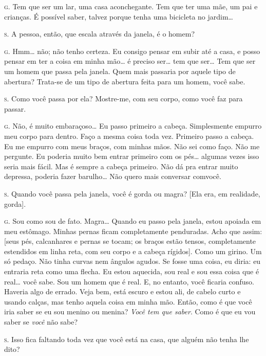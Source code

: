 \noindent\hskip0mm\textsc{g.} Tem que ser um lar, uma casa aconchegante. Tem que ter uma mãe, um
pai e crianças. É possível saber, talvez porque tenha uma bicicleta no
jardim\ldots{}

\noindent\hskip0mm\textsc{s.} A pessoa, então, que escala através da janela, é o homem?

\noindent\hskip0mm\textsc{g.} Hmm\ldots{} não; não tenho certeza. Eu consigo pensar em subir até a casa,
e posso pensar em ter a coisa em minha mão\ldots{} é preciso ser\ldots{} tem que
ser\ldots{} Tem que ser um homem que passa pela janela. Quem mais passaria
por aquele tipo de abertura? Trata-se de um tipo de abertura feita para
um homem, você sabe.

\noindent\hskip0mm\textsc{s.} Como você passa por ela? Mostre-me, com seu corpo, como você faz para
passar.

\noindent\hskip0mm\textsc{g.} Não, é muito embaraçoso\ldots{} Eu passo primeiro a cabeça. Simplesmente
empurro meu corpo para dentro. Faço a mesma coisa toda vez. Primeiro
passo a cabeça. Eu me empurro com meus braços, com minhas mãos. Não sei
como faço. Não me pergunte. Eu poderia muito bem entrar primeiro com os
pés\ldots{} algumas vezes isso seria mais fácil. Mas é sempre a cabeça
primeiro. Não dá pra entrar muito depressa, poderia fazer barulho\ldots{}
Não quero mais conversar com\idxidenhis[|)] você.

\noindent\hskip0mm\textsc{s.} Quando você passa pela janela, você é gorda ou magra? [Ela era, em
realidade, gorda].

\noindent\hskip0mm\textsc{g.} Sou como sou de fato. Magra\ldots{} Quando eu passo pela janela, estou
apoiada em meu estômago. Minhas pernas ficam completamente penduradas.
Acho que assim: [seus pés, calcanhares e pernas se tocam; os braços
estão tensos, completamente estendidos em linha reta, com seu corpo e
a cabeça rígidos]. Como um girino. Um só pedaço. Não tinha curvas nem
ângulos agudos. Se fosse uma coisa, eu diria: eu entraria reta como uma
flecha. Eu estou aquecida, sou real e sou essa coisa que é real\ldots{} você
sabe. Sou um homem que é real. E, no entanto, você ficaria confuso.
Haveria algo de errado. Veja bem, está escuro e estou ali, de cabelo
curto e usando calças, mas tenho aquela coisa em minha mão. Então, como
é que você iria saber se eu sou menino ou menina? \textit{Você tem que
saber}. Como é que eu vou saber se \textit{você} não sabe?

\noindent\hskip0mm\textsc{s.} Isso fica faltando toda vez que você está na casa, que alguém não
tenha lhe dito?

